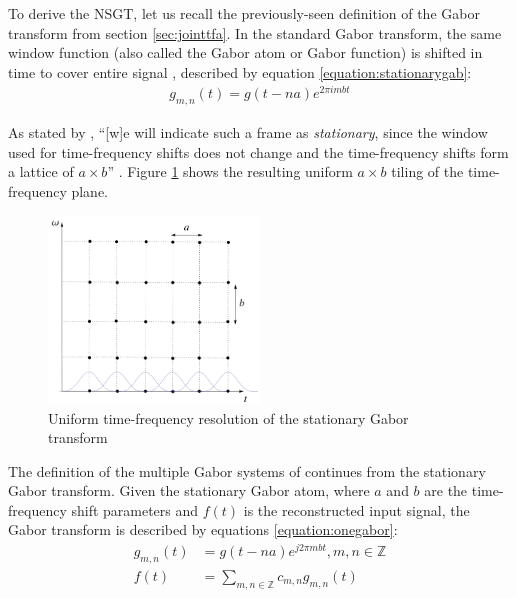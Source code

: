 \documentclass[report.tex]{subfiles}
\begin{document}
To derive the NSGT, let us recall the previously-seen definition of the Gabor transform from section \ref{sec:jointtfa}. In the standard Gabor transform, the same window function (also called the Gabor atom or Gabor function) is shifted in time to cover entire signal \parencite{adaptivecqt}, described by equation \eqref{equation:stationarygab}:
\begin{align} \tag{11}\label{equation:stationarygab}
g_{m, n}(t) = g(t - na)e^{2\pi i m b t}
\end{align}

As stated by \citeauthor{adaptivecqt}, ``[w]e will indicate such a frame as \textit{stationary}, since the window used for time-frequency shifts does not change and the time-frequency shifts form a lattice of $a \times b$'' \parencite[3]{adaptivecqt}. Figure \ref{fig:uniformtflattice} shows the resulting uniform $a \times b$ tiling of the time-frequency plane.

\begin{figure}[ht]
	\centering
	\includegraphics[width=0.5\textwidth]{./images-tftheory/stationarygabor.png}
	\caption{Uniform time-frequency resolution of the stationary Gabor transform \parencite[3]{adaptivecqt}}
	\label{fig:uniformtflattice}
\end{figure}

The definition of the multiple Gabor systems of \textcite{doerflerphd} continues from the stationary Gabor transform. Given the stationary Gabor atom, where $a$ and $b$ are the time-frequency shift parameters and $f(t)$ is the reconstructed input signal, the Gabor transform is described by equations \eqref{equation:onegabor}:
\begin{align}
	\nonumber g_{m,n}(t) &= g(t - na)e^{j2\pi m b t}, m,n \in \mathbb{Z}\\
	\nonumber f(t) &= \sum_{m,n \in \mathbb{Z}}c_{m,n}g_{m,n}(t) \tag{12}\label{equation:onegabor}
\end{align}
\end{document}
